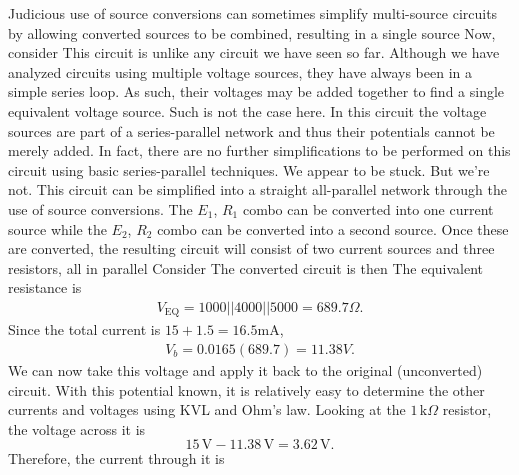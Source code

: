 \documentclass{report}
\begin{document}
\begin{itemize}
            \bigbreak \noindent 
            Judicious use of source conversions can sometimes simplify multi-source circuits by allowing converted sources to be combined, resulting in a single source
            \bigbreak \noindent 
            Now, consider
            \bigbreak \noindent 
            \bigbreak \noindent 
            This circuit is unlike any circuit we have seen so far. Although we have analyzed circuits using multiple voltage sources, they have always been in a simple series loop. As such, their voltages may be added together to find a single equivalent voltage source. Such is not the case here. In this circuit the voltage sources are part of a series-parallel network and thus their potentials cannot be merely added. In fact, there are no further simplifications to be performed on this circuit using basic series-parallel techniques. We appear to be stuck.
            \bigbreak \noindent 
            But we're not. This circuit can be simplified into a straight all-parallel network through the use of source conversions. The $E_{1}$, $R_{1}$ combo can be converted into one current source while the $E_{2}$, $R_{2}$ combo can be converted into a second source. Once these are converted, the resulting circuit will consist of two current sources and three resistors, all in parallel
            \bigbreak \noindent 
            Consider
            \bigbreak \noindent 
            \bigbreak \noindent 
            The converted circuit is then
            \bigbreak \noindent 
            \bigbreak \noindent 
            The equivalent resistance is 
            \begin{align*}
                V_{\text{EQ}} = 1000 || 4000 || 5000 = 689.7 \Omega
            .\end{align*}
            Since the total current is $15 + 1.5 = 16.5$mA,
            \begin{align*}
                V_{b} = 0.0165(689.7) = 11.38V
            .\end{align*}
            We can now take this voltage and apply it back to the original (unconverted) circuit. With this potential known, it is relatively easy to determine the other currents and voltages using KVL and Ohm's law.
            \bigbreak \noindent 
            Looking at the \(1\,\mathrm{k}\Omega\) resistor, the voltage across it is
            \[
                15\,\mathrm{V} - 11.38\,\mathrm{V} = 3.62\,\mathrm{V}.
            \]
            Therefore, the current through it is

\end{itemize}
\end{document}
